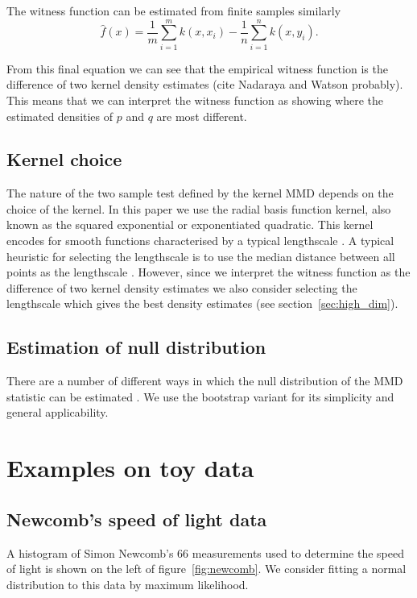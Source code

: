 \documentclass{article} %
\begin{document}
The witness function can be estimated from finite samples similarly
\begin{equation}
\hat{f}(x) = \frac{1}{m}\sum_{i=1}^{m}k(x,x_i) - \frac{1}{n}\sum_{i=1}^{n}k(x,y_i).
\end{equation}

From this final equation we can see that the empirical witness function is the difference of two kernel density estimates (cite Nadaraya and Watson probably).
This means that we can interpret the witness function as showing where the estimated densities of $p$ and $q$ are most different.

\subsection{Kernel choice}

The nature of the two sample test defined by the kernel MMD depends on the choice of the kernel.
In this paper we use the radial basis function kernel, also known as the squared exponential or exponentiated quadratic.
This kernel encodes for smooth functions characterised by a typical lengthscale \citep[e.g.][]{Rasmussen2006-ml}.
A typical heuristic for selecting the lengthscale is to use the median distance between all points as the lengthscale \citep[e.g.][]{Gretton2008-ik}.
However, since we interpret the witness function as the difference of two kernel density estimates we also consider selecting the lengthscale which gives the best density estimates (see section~\ref{sec:high_dim}).

\subsection{Estimation of null distribution}

There are a number of different ways in which the null distribution of the MMD statistic can be estimated \citep[e.g.][]{Gretton2008-ik}.
We use the bootstrap variant for its simplicity and general applicability.

\section{Examples on toy data}

\subsection{Newcomb's speed of light data}

A histogram of Simon Newcomb's 66 measurements used to determine the speed of light \citep{Stigler1977-dd} is shown on the left of figure~\ref{fig:newcomb}.
We consider fitting a normal distribution to this data by maximum likelihood\footnotemark.
\end{document}
